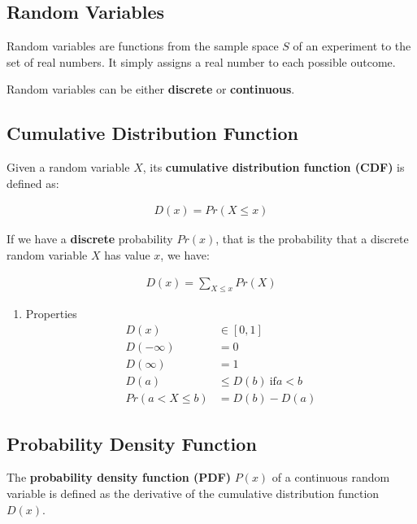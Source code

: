 \documentclass[11pt]{article}
\begin{document}
\subsection{Random Variables}
\label{sec:org2c58000}
Random variables are functions from the sample space \(S\) of an experiment to the set of real numbers. It simply assigns a real number to each possible outcome.

Random variables can be either \textbf{discrete} or \textbf{continuous}.

\subsection{Cumulative Distribution Function}
\label{sec:org34c9691}
Given a random variable \(X\), its \textbf{cumulative distribution function (CDF)} is defined as:

 \begin{align*}
     D\left( x \right) = Pr\left(X \leq x\right)
\end{align*}

If we have a \textbf{discrete} probability \(Pr\left( x \right)\), that is the probability that a discrete random variable \(X\) has value \(x\), we have:

\begin{align*}
    D\left( x \right) = \sum_{X \leq x} Pr\left( X \right)
\end{align*}

\begin{enumerate}
\item Properties
\label{sec:org4a28131}
\begin{align*}
    D\left( x \right) &\in \left[0,1\right] \\
    D\left( -\infty \right) &= 0 \\
    D\left( \infty \right) &= 1 \\
    D\left( a \right) &\leq D\left( b \right)\ \text{if} a < b \\
    Pr\left( a < X \leq b \right) &= D\left( b \right) - D\left( a \right)
\end{align*}
\end{enumerate}

\subsection{Probability Density Function}
\label{sec:org7ac7cac}
The \textbf{probability density function (PDF)} \(P\left( x \right)\) of a continuous random variable is defined as the derivative of the cumulative distribution function \(D\left( x \right)\).
\end{document}
